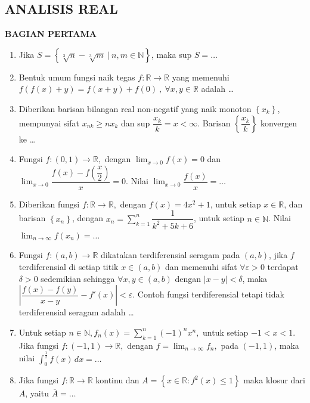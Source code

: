\documentclass[12pt,twoside]{article}
\begin{document}
\subsection{ANALISIS REAL}
\textbf{BAGIAN PERTAMA}
\begin{enumerate}
	\item Jika $S = \left\lbrace \sqrt[3]{n} - \sqrt[3]{m} ~|~ n,m \in \mathbb{N} \right\rbrace$, maka sup $S = \dots$

	\item Bentuk umum fungsi naik tegas $f:\mathbb{R} \to \mathbb{R}$ yang memenuhi $f(f(x)+y) = f(x+y)+f(0)~,~\forall x,y \in\mathbb{R}$ adalah \dots

	\item Diberikan barisan bilangan real non-negatif yang naik monoton $\left\lbrace x_k \right\rbrace$, mempunyai sifat $x_{nk} \geq nx_k$ dan sup $\dfrac{x_k}{k} = x < \infty$. Barisan $\left\lbrace \dfrac{x_k}{k} \right\rbrace$ konvergen ke \dots

	\item Fungsi $f : (0,1) \to \mathbb{R},$ dengan $\displaystyle\lim_{x \to 0} f(x) = 0$ dan $\displaystyle\lim_{x \to 0} \dfrac{f(x)-f\left(\dfrac{x}{2}\right)}{x} = 0 $. Nilai $\displaystyle\lim_{x \to 0} \dfrac{f(x)}{x} = \dots$

	\item Diberikan fungsi $f:\mathbb{R} \to \mathbb{R},$ dengan $f(x) = 4x^2+1$, untuk setiap $x \in \mathbb{R}$, dan barisan $\left\lbrace x_n \right\rbrace$, dengan $x_n = \displaystyle\sum_{k=1}^{n} \dfrac{1}{k^2+5k+6}$, untuk setiap $n \in \mathbb{N}$. Nilai $\displaystyle\lim_{n \to \infty} f(x_n) = \dots$

	\item Fungsi $f : (a,b)\to \mathbb{R}$ dikatakan terdiferensial seragam pada $(a,b)$, jika $f$ terdiferensial di setiap titik $x \in (a,b)$ dan memenuhi sifat $\forall \varepsilon > 0$ terdapat $\delta > 0$ sedemikian sehingga $\forall x,y \in (a,b)$ dengan $|x-y|<\delta$, maka $\left| \dfrac{f(x)-f(y)}{x-y} - f'(x) \right| < \varepsilon$. Contoh fungsi terdiferensial tetapi tidak terdiferensial seragam adalah \dots

	\item Untuk setiap $n \in \mathbb{N}, f_n(x)=\displaystyle\sum_{k=1}^{n} (-1)^nx^n,$ untuk setiap $-1 < x < 1$. Jika fungsi $f : (-1,1) \to \mathbb{R},$ dengan $f = \displaystyle\lim_{n \to \infty} f_n,$ pada $(-1,1)$, maka nilai $\displaystyle\int_{0}^{\frac{1}{2}} f(x)\,dx = \dots$

	\item Jika fungsi $f : \mathbb{R} \to \mathbb{R}$ kontinu dan $A = \left\lbrace x \in \mathbb{R} : f^2(x) \leq 1 \right\rbrace$ maka klosur dari $A$, yaitu $\overline{A} = \dots$
\end{enumerate}
\end{document}

